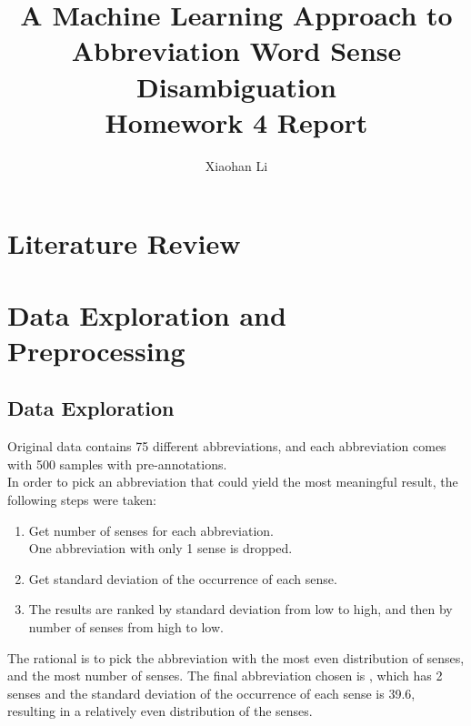 \documentclass{article}
\author{Xiaohan Li}
\title{\huge{A Machine Learning Approach to Abbreviation Word Sense Disambiguation}\\
\LARGE{Homework 4 Report}}
\begin{document}
    \begin{titlepage}
        \maketitle    
    \end{titlepage}
    \tableofcontents
    \section{Literature Review}
    \section{Data Exploration and Preprocessing}
    \subsection{Data Exploration}
    Original data contains 75 different abbreviations, and each abbreviation comes with 500 samples with pre-annotations.\\
    In order to pick an abbreviation that could yield the most meaningful result, the following steps were taken:
    \begin{enumerate}
        \item Get number of senses for each abbreviation.\\
              One abbreviation with only 1 sense is dropped.
        \item Get standard deviation of the occurrence of each sense.
        \item The results are ranked by standard deviation from low to high, and then by number of senses from high to low.
    \end{enumerate}
    The rational is to pick the abbreviation with the most even distribution of senses, and the most number of senses.
    The final abbreviation chosen is , which has 2 senses and the standard deviation of the occurrence of each sense is 39.6, resulting in a relatively even distribution of the senses.
\end{document}
